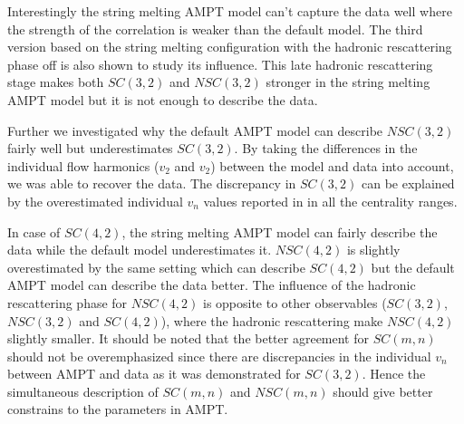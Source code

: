 Interestingly the string melting AMPT model can't capture the data well where the strength of the correlation is weaker than the default model. The third version based on the string melting configuration with the hadronic rescattering phase off is also shown to study its influence. This late hadronic rescattering stage makes both $SC(3,2)$ and $NSC(3,2)$ stronger in the string melting AMPT model but it is not enough to describe the data.

Further we investigated why the default AMPT model can describe $NSC(3,2)$ fairly well but underestimates $SC(3,2)$. By taking the differences in the individual flow harmonics ($v_2$ and $v_2$) between the model and data into account, we was able to recover the data. The discrepancy in $SC(3,2)$ can be explained by the overestimated individual $v_n$ values reported in \cite{Adam:2016nfo} in all the centrality ranges. 

In case of $SC(4,2)$, the string melting AMPT model can fairly describe the data while the default model underestimates it.
$NSC(4,2)$ is slightly overestimated by the same setting which can describe $SC(4,2)$ but the default AMPT model can describe the data better.
The influence of the hadronic rescattering phase for $NSC(4,2)$ is opposite to other observables ($SC(3,2)$, $NSC(3,2)$ and $SC(4,2)$), where the hadronic rescattering make $NSC(4,2)$ slightly smaller.
It should be noted that the better agreement for $SC(m,n)$ should not be overemphasized since there are discrepancies in the individual $v_n$ between AMPT and data as it was demonstrated for $SC(3,2)$.
Hence the simultaneous description of $SC(m,n)$ and $NSC(m,n)$ should give better constrains to the parameters in AMPT.




